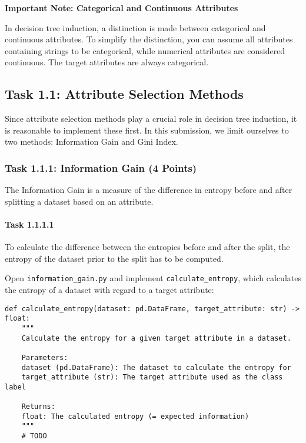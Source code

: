 \documentclass[
english,
smallborders
]{i6prcsht}
\newcommand{\points}[1]{\hfill \color{red}(#1 Points)\color{black}}
\begin{document}
\vspace*{1mm}

\begin{mdframed}
	\begin{em}
		\textbf{Important Note: Categorical and Continuous Attributes}

		In decision tree induction, a distinction is made between categorical and continuous attributes. To simplify the distinction, you can assume all attributes containing strings to be categorical, while numerical attributes are considered continuous. The target attributes are always categorical.
	\end{em}
\end{mdframed}

\subsection*{Task 1.1: Attribute Selection Methods}

Since attribute selection methods play a crucial role in decision tree induction, it is reasonable to implement these first. In this submission, we limit ourselves to two methods: Information Gain and Gini Index.

\subsubsection*{Task 1.1.1: Information Gain \points{4}}

The Information Gain is a measure of the difference in entropy before and after splitting a dataset based on an attribute.

\paragraph*{Task 1.1.1.1} \hfill

To calculate the difference between the entropies before and after the split, the entropy of the dataset prior to the split has to be computed.

Open \texttt{information\_gain.py} and implement \texttt{calculate\_entropy}, which calculates the entropy of a dataset with regard to a target attribute:

\vspace*{0.3cm}

\begin{lstlisting}
def calculate_entropy(dataset: pd.DataFrame, target_attribute: str) -> float:
	"""
	Calculate the entropy for a given target attribute in a dataset.

	Parameters:
	dataset (pd.DataFrame): The dataset to calculate the entropy for
	target_attribute (str): The target attribute used as the class label

	Returns:
	float: The calculated entropy (= expected information)
	"""
	# TODO
\end{lstlisting}
\end{document}
